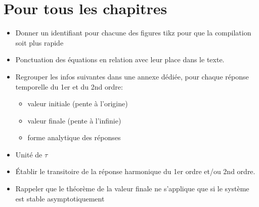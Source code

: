 \section*{Pour tous les chapitres}
\begin{itemize}
\item Donner un identifiant pour chacune des figures tikz pour que la 
      compilation soit plus rapide
\item Ponctuation des équations en relation avec leur place dans le texte.
\item Regrouper les infos suivantes dans une annexe dédiée, pour chaque 
      réponse temporelle du 1er et du 2nd ordre:
    \begin{itemize}
        \item valeur initiale (pente à l'origine)
        \item valeur finale (pente à l'infinie)
        \item forme analytique des réponses
    \end{itemize}
\item Unité de $\tau$
\item \'Etablir le transitoire de la réponse harmonique du 1er ordre et/ou 
      2nd ordre.
\item Rappeler que le théorème de la valeur finale ne s'applique que si le 
      système est stable asymptotiquement
\end{itemize}
\section*{}     

